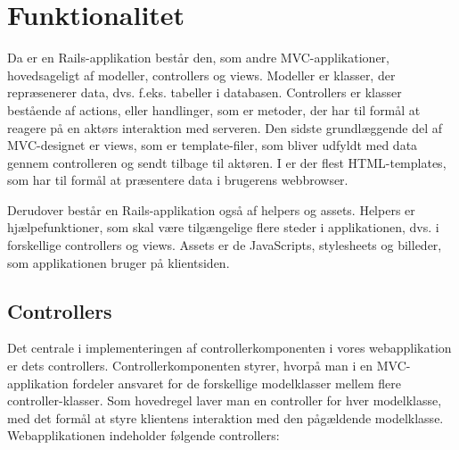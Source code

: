 \section{Funktionalitet}
\label{sec:funktionalitet}

Da {\Foodl} er en Rails-applikation består den, som andre MVC-applikationer, hovedsageligt af modeller, controllers og views. Modeller er klasser, der repræsenerer data, dvs. f.eks. tabeller i databasen. Controllers er klasser bestående af actions, eller handlinger, som er metoder, der har til formål at reagere på en aktørs interaktion med serveren. Den sidste grundlæggende del af MVC-designet er views, som er template-filer, som bliver udfyldt med data gennem controlleren og sendt tilbage til aktøren. I \Foodl{} er der flest HTML-templates, som har til formål at præsentere data i brugerens webbrowser.

Derudover består en Rails-applikation også af helpers og assets. Helpers er hjælpefunktioner, som skal være tilgængelige flere steder i applikationen, dvs. i forskellige controllers og views. Assets er de JavaScripts, stylesheets og billeder, som applikationen bruger på klientsiden. 

\subsection{Controllers}
\label{sec:controllers}

Det centrale i implementeringen af controllerkomponenten i vores webapplikation er dets controllers. Controllerkomponenten styrer, hvorpå man i en MVC-applikation fordeler ansvaret for de forskellige modelklasser mellem flere controller-klasser. Som hovedregel laver man en controller for hver modelklasse, med det formål at styre klientens interaktion med den pågældende modelklasse. Webapplikationen indeholder følgende controllers:

